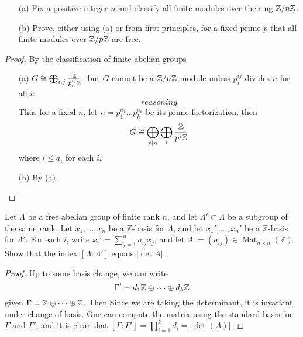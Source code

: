 \begin{prob}[F2018-Q3]
    \phantom{text}
    \begin{itemize}
        \item[(a)] Fix a positive integer \( n \) and classify all finite modules over the ring \( \mathbb{Z}/n\mathbb{Z} \).
        \item[(b)] Prove, either using (a) or from first principles, for a fixed prime \( p \) that all finite modules over \( \mathbb{Z}/p\mathbb{Z} \) are free.
    \end{itemize}
\end{prob}
\begin{proof}
    By the classification of finite abelian groups
    \begin{itemize}
        \item[(a)] $G\cong\bigoplus_{i,j}\frac{\mathbb{Z}}{p_i^{ij}\mathbb{Z}}$, but $G$ cannot be a $\mathbb{Z}/n\mathbb{Z}$-module unless $p_i^{ij}$ divides $n$ for all $i$:
        \begin{equation*}
            reasoning
        \end{equation*}
        Thus for a fixed $n$, let $n=p_1^{a_1}\dots p_k^{a_k}$ be its prime factorization, then 
        \begin{equation*}
            G\cong \bigoplus_{p\mid n}\bigoplus_{i}\frac{\mathbb{Z}}{p^i\mathbb{Z}}
        \end{equation*}
        where $i\leq a_i$ for each $i$.
        \item[(b)] By (a).
    \end{itemize}
\end{proof}


\begin{prob}[F2017-Q2]
    Let \(\Lambda\) be a free abelian group of finite rank \(n\), and let \(\Lambda' \subset \Lambda\) be a subgroup of the same rank. Let \(x_1, \ldots, x_n\) be a \(\mathbb{Z}\)-basis for \(\Lambda\), and let \(x_1', \ldots, x_n'\) be a \(\mathbb{Z}\)-basis for \(\Lambda'\). For each \(i\), write \(x_i' = \sum_{j=1}^n a_{ij}x_j\), and let \(A := (a_{ij}) \in \operatorname{Mat}_{n \times n}(\mathbb{Z})\). Show that the index \([\Lambda : \Lambda']\) equals \(|\det A|\).
\end{prob}
\begin{proof}
    Up to some basis change, we can write 
    \begin{equation*}
        \Gamma'=d_1\mathbb{Z}\oplus\dots\oplus d_k\mathbb{Z}
    \end{equation*}
    given $\Gamma=\mathbb{Z}\oplus\dots\oplus\mathbb{Z}$. Then Since we are taking the determinant, it is invariant under change of basis. One can compute the matrix using the standard basis for $\Gamma$ and $\Gamma'$, and it is clear that $[\Gamma:\Gamma']=\prod_{i=1}^kd_i=|\det(A)|$.
\end{proof}


